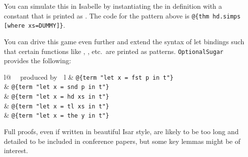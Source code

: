 \begin{isabellebody}
\begin{isamarkuptext}
  You can simulate this in Isabelle by instantiating the  in
  definition \mbox{} with a constant  that
  is printed as \isa{\_}. The code for the pattern above is 
  \verb!@!\verb!{thm hd.simps [where xs=DUMMY]}!.

  You can drive this game even further and extend the syntax of let
  bindings such that certain functions like , , 
  etc.\ are printed as patterns. \texttt{OptionalSugar} provides the
  following:
  
  \begin{center}
  \begin{tabular}{l@ {~~produced by~~}l}
   & \verb!@!\verb!{term "let x = fst p in t"}!\\
   & \verb!@!\verb!{term "let x = snd p in t"}!\\
   & \verb!@!\verb!{term "let x = hd xs in t"}!\\
   & \verb!@!\verb!{term "let x = tl xs in t"}!\\
   & \verb!@!\verb!{term "let x = the y in t"}!\\
  \end{tabular}
  \end{center}%
\end{isamarkuptext}%
\isamarkuptrue%
%
\isamarkuptrue%
%
\begin{isamarkuptext}%
Full proofs, even if written in beautiful Isar style, are likely to
  be too long and detailed to be included in conference papers, but
  some key lemmas might be of interest.


\end{isamarkuptext}
\end{isabellebody}
